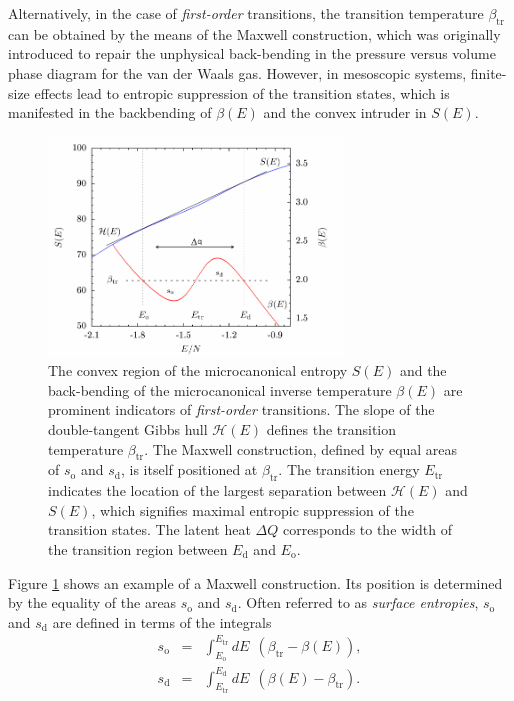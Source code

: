 \documentclass[12pt]{report}
\begin{document}
Alternatively, in the case of \textit{first-order} transitions, the transition temperature $\beta_{\mathrm{tr}}$ can be obtained by the means of the Maxwell construction, which was originally introduced to repair the unphysical back-bending in the pressure versus volume phase diagram for the van der Waals gas. However, in mesoscopic systems, finite-size effects lead to entropic suppression of the transition states, which is manifested in the backbending of $\beta(E)$ and the convex intruder in $S(E)$. 
%
\begin{figure}
\center
\includegraphics[width = 0.7\textwidth]{chapter2Figs/maxwellConstruct.pdf}
\caption{\label{fig:Fig_2}%
The convex region of the microcanonical entropy $S(E)$ and the back-bending of the microcanonical inverse temperature $\beta(E)$ are prominent indicators of \textit{first-order} transitions. The slope of the double-tangent Gibbs hull $\mathcal{H}(E)$ defines the transition temperature $\beta_{\mathrm{tr}}$. The Maxwell construction, defined by equal areas of $s_{\mathrm{o}}$ and $s_{\mathrm{d}}$, is itself positioned at $\beta_{\mathrm{tr}}$. The transition energy $E_{\mathrm{tr}}$ indicates the location of the largest separation between $\mathcal{H}(E)$ and $S(E)$, which signifies maximal entropic suppression of the transition states. The latent heat $\Delta Q$ corresponds to the width of the transition region between $E_{\mathrm{d}}$ and $E_{\mathrm{o}}$.}
\end{figure}
%
Figure \ref{fig:Fig_2} shows an example of a Maxwell construction. Its position is determined by the equality of the areas $s_{\mathrm{o}}$ and $s_{\mathrm{d}}$. Often referred to as \textit{surface entropies}, $s_{\mathrm{o}}$ and $s_{\mathrm{d}}$ are defined in terms of the integrals
\begin{eqnarray}
s_{\mathrm{o}} &=& \int_{E_{\mathrm{o}}}^{E_{\mathrm{tr}}} dE \:\: (\beta_{\mathrm{tr}}-\beta(E)), \\
s_{\mathrm{d}} &=& \int_{E_{\mathrm{tr}}}^{E_{\mathrm{d}}} dE \:\: (\beta(E)-\beta_{\mathrm{tr}}).
\end{eqnarray}
\end{document}
